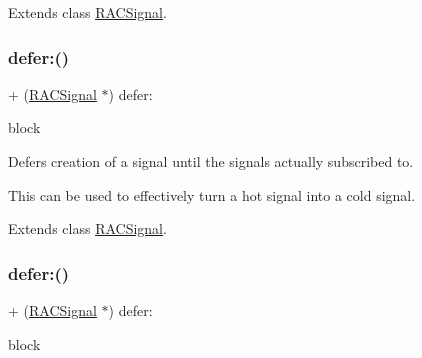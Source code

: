 Extends class \mbox{\hyperlink{interface_r_a_c_signal_afab1b19558df566351cf87e466a5022f}{R\+A\+C\+Signal}}.

\mbox{\label{category_r_a_c_signal_07_operations_08_a3f29638c9c7f60928b7a6cbf2fe25d6f}} 
\subsubsection{\texorpdfstring{defer\+:()}{defer:()}\hspace{0.1cm}{\footnotesize\ttfamily [1/3]}}
{\footnotesize\ttfamily + (\mbox{\hyperlink{interface_r_a_c_signal}{R\+A\+C\+Signal}} $\ast$) defer\+: \begin{DoxyParamCaption}\item[{(\mbox{\hyperlink{interface_r_a_c_signal}{R\+A\+C\+Signal}} $\ast$($^\wedge$)(void))}]{block }\end{DoxyParamCaption}}

Defers creation of a signal until the signal\textquotesingle{}s actually subscribed to.

This can be used to effectively turn a hot signal into a cold signal. 

Extends class \mbox{\hyperlink{interface_r_a_c_signal_a3f29638c9c7f60928b7a6cbf2fe25d6f}{R\+A\+C\+Signal}}.

\mbox{\label{category_r_a_c_signal_07_operations_08_a3f29638c9c7f60928b7a6cbf2fe25d6f}} 
\subsubsection{\texorpdfstring{defer\+:()}{defer:()}\hspace{0.1cm}{\footnotesize\ttfamily [2/3]}}
{\footnotesize\ttfamily + (\mbox{\hyperlink{interface_r_a_c_signal}{R\+A\+C\+Signal}} $\ast$) defer\+: \begin{DoxyParamCaption}\item[{(\mbox{\hyperlink{interface_r_a_c_signal}{R\+A\+C\+Signal}} $\ast$($^\wedge$)(void))}]{block }\end{DoxyParamCaption}}

